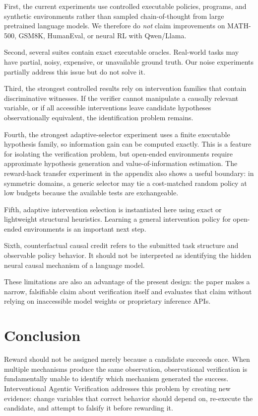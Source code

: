 \documentclass[10pt]{article}
\begin{document}
First, the current experiments use controlled executable policies, programs, and synthetic environments rather than sampled chain-of-thought from large pretrained language models. We therefore do \emph{not} claim improvements on MATH-500, GSM8K, HumanEval, or neural RL with Qwen/Llama.

Second, several suites contain exact executable oracles. Real-world tasks may have partial, noisy, expensive, or unavailable ground truth. Our noise experiments partially address this issue but do not solve it.

Third, the strongest controlled results rely on intervention families that contain discriminative witnesses. If the verifier cannot manipulate a causally relevant variable, or if all accessible interventions leave candidate hypotheses observationally equivalent, the identification problem remains.

Fourth, the strongest adaptive-selector experiment uses a finite executable hypothesis family, so information gain can be computed exactly. This is a feature for isolating the verification problem, but open-ended environments require approximate hypothesis generation and value-of-information estimation. The reward-hack transfer experiment in the appendix also shows a useful boundary: in symmetric domains, a generic selector may tie a cost-matched random policy at low budgets because the available tests are exchangeable.

Fifth, adaptive intervention selection is instantiated here using exact or lightweight structural heuristics. Learning a general intervention policy for open-ended environments is an important next step.

Sixth, counterfactual causal credit refers to the submitted task structure and observable policy behavior. It should not be interpreted as identifying the hidden neural causal mechanism of a language model.

These limitations are also an advantage of the present design: the paper makes a narrow, falsifiable claim about verification itself and evaluates that claim without relying on inaccessible model weights or proprietary inference APIs.

\section{Conclusion}

Reward should not be assigned merely because a candidate succeeds once. When multiple mechanisms produce the same observation, observational verification is fundamentally unable to identify which mechanism generated the success. Interventional Agentic Verification addresses this problem by creating new evidence: change variables that correct behavior should depend on, re-execute the candidate, and attempt to falsify it before rewarding it.
\end{document}
